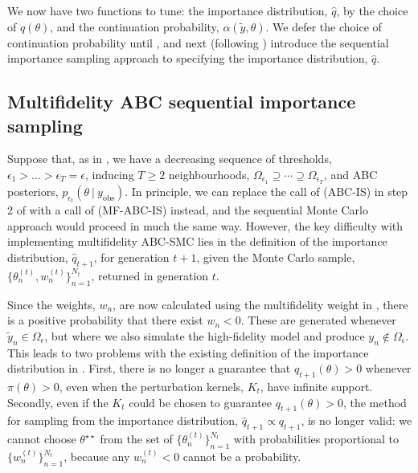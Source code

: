 \documentclass[12pt, onecolumn]{article}
\newcommand{\obs}[1]{#1_{\mathrm{obs}}}
\begin{document}
We now have two functions to tune: the importance distribution, $\hat q$, by the choice of $q(\theta)$, and the continuation probability, $\alpha(\tilde y, \theta)$.
We defer the choice of continuation probability until , and next (following ) introduce the sequential importance sampling approach to specifying the importance distribution, $\hat q$.

\subsection{Multifidelity ABC sequential importance sampling}
\label{s:MF-ABC-SIS}

Suppose that, as in , we have a decreasing sequence of thresholds, $\epsilon_1 > \dots > \epsilon_T = \epsilon$, inducing $T \geq 2$ neighbourhoods, $\Omega_{\epsilon_1} \supseteq \cdots \supseteq \Omega_{\epsilon_T}$, and ABC posteriors, $p_{\epsilon_t}(\theta~|~\obs y)$.
In principle, we can replace the call of  (ABC-IS) in step 2 of  with a call of  (MF-ABC-IS) instead, and the sequential Monte Carlo approach would proceed in much the same way.
However, the key difficulty with implementing multifidelity ABC-SMC lies in the definition of the importance distribution, $\hat q_{t+1}$, for generation $t+1$, given the Monte Carlo sample, $\{ \theta_n^{(t)}, w_n^{(t)} \}_{n=1}^{N_t}$, returned in generation $t$. 

Since the weights, $w_n$, are now calculated using the multifidelity weight in , there is a positive probability that there exist $w_n < 0$.
These are generated whenever $\tilde y_n \in \Omega_\epsilon$, but where we also simulate the high-fidelity model and produce $y_n \notin \Omega_\epsilon$.
This leads to two problems with the existing definition of the importance distribution in .
First, there is no longer a guarantee that $q_{t+1}(\theta) > 0$ whenever $\pi(\theta)>0$, even when the perturbation kernels, $K_t$, have infinite support.
Secondly, even if the $K_t$ could be chosen to guarantee $q_{t+1}(\theta)>0$, the method for sampling from the importance distribution, $\hat q_{t+1} \propto q_{t+1}$, is no longer valid: 
we cannot choose $\theta^{\star \star}$ from the set of $\{ \theta_n^{(t)} \}_{n=1}^{N_t}$ with probabilities proportional to $\{ w_n^{(t)} \}_{n=1}^{N_t}$, because any $w_n^{(t)} < 0$ cannot be a probability.
\end{document}

